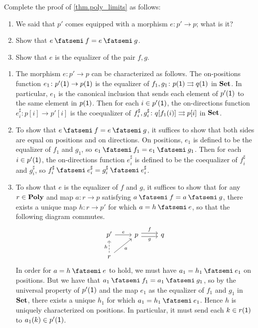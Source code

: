 \documentclass[Book-Poly]{subfiles}
\begin{document}
\begin{exercise}\label{exc.poly_limits}
Complete the proof of \cref{thm.poly_limits} as follows:
\begin{enumerate}
	\item We said that $p'$ comes equipped with a morphism $e \colon p' \to p$; what is it?
	\item Show that $e \then f = e \then g$.
	\item Show that $e$ is the equalizer of the pair $f,g$.
\qedhere
\end{enumerate}
\begin{solution}
\begin{enumerate}
    \item The morphism $e \colon p' \to p$ can be characterized as follows.
    The on-positions function $e_1 \colon p'(\textsf{1}) \to p(\textsf{1})$ is the equalizer of $f_1, g_1 \colon p(\textsf{1}) \rightrightarrows q(\textsf{1})$ in $\mathbf{Set}$.
    In particular, $e_1$ is the canonical inclusion that sends each element of $p'(\textsf{1})$ to the same element in $p(\textsf{1})$.
    Then for each $i \in p'(\textsf{1})$, the on-directions function $e^\sharp_i \colon p[i] \to p'[i]$ is the coequalizer of $f^\sharp_i, g^\sharp_i \colon q[f_1(i)] \rightrightarrows p[i]$ in $\mathbf{Set}$.
    
    \item To show that $e \then f = e \then g$, it suffices to show that both sides are equal on positions and on directions.
    On positions, $e_1$ is defined to be the equalizer of $f_1$ and $g_1$, so $e_1 \then f_1 = e_1 \then g_1$.
    Then for each $i \in p'(\textsf{1})$, the on-directions function $e^\sharp_i$ is defined to be the coequalizer of $f^\sharp_i$ and $g^\sharp_i$, so $f^\sharp_i \then e^\sharp_i = g^\sharp_i \then e^\sharp_i$.
    
    \item To show that $e$ is the equalizer of $f$ and $g$, it suffices to show that for any $r \in \mathbf{Poly}$ and map $a \colon r \to p$ satisfying $a \then f = a \then g$, there exists a unique map $h \colon r \to p'$ for which $a = h \then e$, so that the following diagram commutes.
    \begin{equation*} %
    \begin{tikzcd}
        p' \ar[r, "e"] & p \ar[r, "f", shift left] \ar[r, "g"', shift right] & q \\
        r \ar[u, "h", dashed] \ar[ur, "a"']
    \end{tikzcd}
    \end{equation*}
    In order for $a = h \then e$ to hold, we must have $a_1 = h_1 \then e_1$ on positions.
    But we have that $a_1 \then f_1 = a_1 \then g_1$, so by the universal property of $p'(\textsf{1})$ and the map $e_1$ as the equalizer of $f_1$ and $g_1$ in $\mathbf{Set}$, there exists a unique $h_1$ for which $a_1 = h_1 \then e_1$.
    Hence $h$ is uniquely characterized on positions.
    In particular, it must send each $k \in r(\textsf{1})$ to $a_1(k) \in p'(\textsf{1})$.
    

\end{enumerate}
\end{solution}
\end{exercise}
\end{document}
